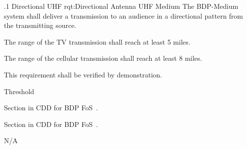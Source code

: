 
\NRQMTT
{\RqtNumberBase.1}
{Directional UHF}
{rqt:Directional Antenna UHF Medium}
{The BDP-Medium system shall deliver a \UHF transmission to an audience in a directional pattern from the transmitting source.}%
{
	\item The range of the \UHF TV transmission shall reach at least 5 miles.
	\item The range of the \UHF cellular transmission shall reach at least 8 miles.
}
{This requirement shall be verified by demonstration.}
{
	\item [Phase 1] Threshold
}
{
\item [5.1.2] Section in CDD for BDP FoS~\cite{ref__BDP_FOS_CDD}.
\item [5.1.3] Section in CDD for BDP FoS~\cite{ref__BDP_FOS_CDD}.
} 
{
	\item N/A
}


